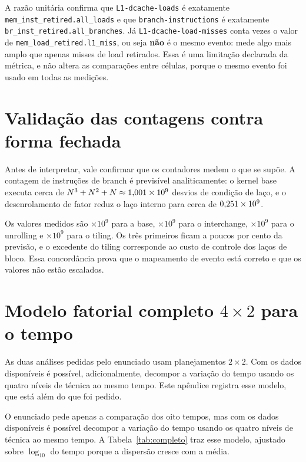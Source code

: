 \documentclass[11pt,a4paper]{article}
\begin{document}
\begin{sloppypar}
A razão unitária confirma que \texttt{L1-dcache-loads} é exatamente
\texttt{mem\_inst\_retired.all\_loads} e que \texttt{branch-instructions} é exatamente
\texttt{br\_inst\_retired.all\_branches}. Já
\texttt{L1-dcache-load-misses} conta \valRazaoEvMisses{} vezes o valor de
\texttt{mem\_load\_retired.l1\_miss}, ou seja \textbf{não} é o mesmo evento: mede algo
mais amplo que apenas misses de load retirados. Essa é uma limitação declarada da
métrica, e não altera as comparações entre células, porque o mesmo evento foi usado em
todas as \valMedicoes{} medições.
\end{sloppypar}


\section{Validação das contagens contra forma fechada}
\label{ap:fechada}

Antes de interpretar, vale confirmar que os contadores medem o que se supõe. A contagem de
instruções de branch é previsível analiticamente: o kernel base executa cerca de
$N^3 + N^2 + N \approx 1{,}001\times10^9$ desvios de condição de laço, e o
desenrolamento de fator \valUnroll{} reduz o laço interno para cerca de
$0{,}251\times10^9$.

Os valores medidos são \valBrinstBase$\times10^9$ para a base,
\valBrinstInter$\times10^9$ para o interchange, \valBrinstUnroll$\times10^9$ para o
unrolling e \valBrinstTiling$\times10^9$ para o tiling. Os três primeiros ficam a poucos
por cento da previsão, e o excedente do tiling corresponde ao custo de controle dos laços
de bloco. Essa concordância prova que o mapeamento de evento está correto e que os valores
não estão escalados.


\section{Modelo fatorial completo $4\times2$ para o tempo}
\label{ap:modelo}

As duas análises pedidas pelo enunciado usam planejamentos $2\times2$. Com os dados
disponíveis é possível, adicionalmente, decompor a variação do tempo usando os quatro
níveis de técnica ao mesmo tempo. Este apêndice registra esse modelo, que está além do
que foi pedido.

O enunciado pede apenas a comparação dos oito tempos, mas com os dados disponíveis é
possível decompor a variação do tempo usando os quatro níveis de técnica ao mesmo tempo.
A Tabela~\ref{tab:completo} traz esse modelo, ajustado sobre $\log_{10}$ do tempo porque
a dispersão cresce com a média.
\end{document}
